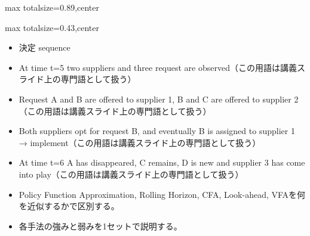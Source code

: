 \begin{minipage}[t]{0.58\textwidth}
\begin{adjustbox}{max totalsize={\textwidth}{0.89\textheight},center}
\begin{minipage}{\textwidth}
\end{minipage}
\end{adjustbox}
\end{minipage}


\clearpage
{}
\begin{minipage}[t]{0.405\textwidth}
\begin{adjustbox}{max totalsize={\textwidth}{0.43\textheight},center}
\begin{minipage}{\textwidth}\scriptsize
{}\begin{itemize}
\item 決定 sequence
\item At time t=5 two suppliers and three request are observed（この用語は講義スライド上の専門語として扱う）
\item Request A and B are offered to supplier 1, B and C are offered to supplier 2（この用語は講義スライド上の専門語として扱う）
\item Both suppliers opt for request B, and eventually B is assigned to supplier 1 → implement（この用語は講義スライド上の専門語として扱う）
\item At time t=6 A has disappeared, C remains, D is new and supplier 3 has come into play（この用語は講義スライド上の専門語として扱う）
\end{itemize}\begin{itemize}
\item Policy Function Approximation, Rolling Horizon, CFA, Look-ahead, VFAを何を近似するかで区別する。
\item 各手法の強みと弱みを1セットで説明する。
\end{itemize}
\end{minipage}
\end{adjustbox}
\end{minipage}\hfill
